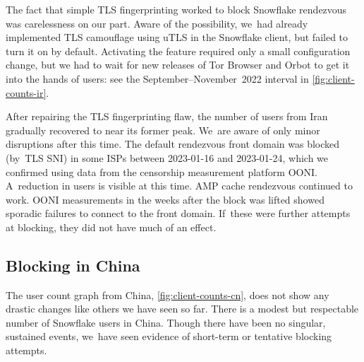 \documentclass[letterpaper,twocolumn]{article}
\begin{document}
The fact that simple TLS fingerprinting worked to block Snowflake rendezvous
was carelessness on our part.
Aware of the possibility,
we~had already implemented TLS camouflage using uTLS
in the Snowflake client,
but failed to turn it on by default.
Activating the feature required only a small configuration change,
but we had to wait for new releases of Tor Browser and Orbot
to get it into the hands of users:
see the September--November~2022 interval in \autoref{fig:client-counts-ir}.


After repairing the TLS fingerprinting flaw,
the number of users from Iran gradually recovered
to near its former peak.
We~are aware of only minor disruptions after this time.
The default rendezvous front domain
was blocked (by~TLS SNI) in some ISPs
between \mbox{2023-01-16} and \mbox{2023-01-24},
which we confirmed using data from the censorship measurement platform OONI.
A~reduction in users is visible at this time.
AMP cache rendezvous continued to work.
OONI measurements in the weeks after the block was lifted showed sporadic
failures to connect to the front domain.
If~these were further attempts at blocking,
they did not have much of an effect.

\subsection{Blocking in China}
\label{sec:block-cn}


The user count graph from China,
\autoref{fig:client-counts-cn},
does not show any drastic changes
like others we have seen so far.
There is a modest but respectable number of Snowflake users in China.
Though there have been no singular, sustained events,
we~have seen evidence of short-term or tentative
blocking attempts.
\end{document}
